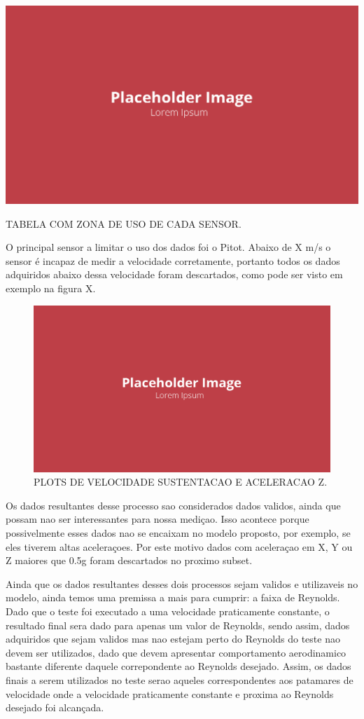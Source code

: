 \begin{table}[!ht]
    \centering
    \includegraphics[width=.8\linewidth]{figuras/placeholder.png}
    \caption{TABELA COM ZONA DE USO DE CADA SENSOR\cite{autor}.}
    \label{fig:placeholder}
\end{table}

O principal sensor a limitar o uso dos dados foi o Pitot. Abaixo de X m/s o sensor é incapaz de medir a velocidade corretamente, portanto todos os dados adquiridos abaixo dessa velocidade foram descartados, como pode ser visto em exemplo na figura X.

\begin{figure}[!ht]
    \centering
    \includegraphics[width=.8\linewidth]{figuras/placeholder.png}
    \caption{PLOTS DE VELOCIDADE SUSTENTACAO E ACELERACAO Z\cite{autor}.}
    \label{fig:placeholder}
\end{figure}

Os dados resultantes desse processo sao considerados dados validos, ainda que possam nao ser interessantes para nossa mediçao. Isso acontece porque possivelmente esses dados nao se encaixam no modelo proposto, por exemplo, se eles tiverem altas aceleraçoes. Por este motivo dados com aceleraçao em X, Y ou Z maiores que 0.5g foram descartados no proximo subset.

Ainda que os dados resultantes desses dois processos sejam validos e utilizaveis no modelo, ainda temos uma premissa a mais para cumprir: a faixa de Reynolds. Dado que o teste foi executado a uma velocidade praticamente constante, o resultado final sera dado para apenas um valor de Reynolds, sendo assim, dados adquiridos que sejam validos mas nao estejam perto do Reynolds do teste nao devem ser utilizados, dado que devem apresentar comportamento aerodinamico bastante diferente daquele correpondente ao Reynolds desejado. Assim, os dados finais a serem utilizados no teste serao aqueles correspondentes aos patamares de velocidade onde a velocidade praticamente constante e proxima ao Reynolds desejado foi alcançada. 

